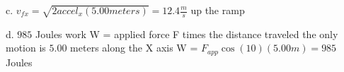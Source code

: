 c. $v_{fx} = \sqrt{2accel_{x}(5.00 meters)} = 12.4 \frac{m}{s}$ up the ramp\newline

d. $985$ Joules\newline
work W = applied force F times the distance traveled\newline
the only motion is $5.00$ meters along the X axis\newline
W = $F_{app}\cos(10)(5.00 m) = 985$ Joules\newline


